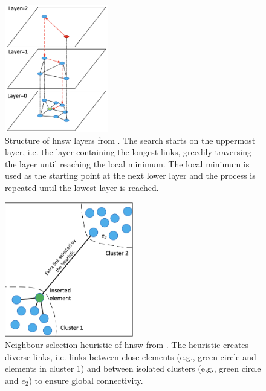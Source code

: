 \begin{figure}[!htb] %
    \centering
    \includegraphics[width=0.4\textwidth]{images/Elasticsearch/HNSW-layer.png}
    \caption[Structure of \ac{hnsw} layers]{Structure of \ac{hnsw} layers from \cite{Elasticsearch-kNN-HNSW}.
    The search starts on the uppermost layer, i.e. the layer containing the longest links, greedily traversing the layer until reaching the local minimum.
    The local minimum is used as the starting point at the next lower layer and the process is repeated until the lowest layer is reached.
    }
    \label{fig:hnsw-layer}
\end{figure}

\begin{figure}[!htb] %
    \centering
    \includegraphics[width=0.5\textwidth]{images/Elasticsearch/HNSW-neighbour-selection-heuristic.png}
    \caption[Neighbour selection heuristic of \ac{hnsw}]{Neighbour selection heuristic of \ac{hnsw} from \cite{Elasticsearch-kNN-HNSW}.
    The heuristic creates diverse links, i.e. links between close elements (e.g., green circle and elements in cluster 1) 
    and between isolated clusters (e.g., green circle and $e_2$) to ensure global connectivity.
    }
    \label{fig:hnsw-heuristic}
\end{figure}

